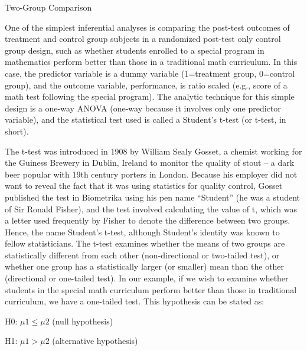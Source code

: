 Two-Group Comparison

One of the simplest inferential analyses is comparing the post-test outcomes of treatment and control group subjects in a randomized post-test only control group design, such as whether students enrolled to a special program in mathematics perform better than those in a traditional math curriculum. In this case, the predictor variable is a dummy variable (1=treatment group, 0=control group), and the outcome variable, performance, is ratio scaled (e.g., score of a math test following the special program). The analytic technique for this simple design is a one-way ANOVA (one-way because it involves only one predictor variable), and the statistical test used is called a Student’s t-test (or t-test, in short). 

The t-test was introduced in 1908 by William Sealy Gosset, a chemist working for the Guiness Brewery in Dublin, Ireland to monitor the quality of stout – a dark beer popular with 19th century porters in London. Because his employer did not want to reveal the fact that it was using statistics for quality control, Gosset published the test in Biometrika using his pen name “Student” (he was a student of Sir Ronald Fisher), and the test involved calculating the value of t, which was a letter used frequently by Fisher to denote the difference between two groups. Hence, the name Student’s t-test, although Student’s identity was known to fellow statisticians. The t-test examines whether the means of two groups are statistically different from each other (non-directional or two-tailed test), or whether one group has a statistically larger (or smaller) mean than the other (directional or one-tailed test). In our example, if we wish to examine whether students in the special math curriculum perform better than those in traditional curriculum, we have a one-tailed test. This hypothesis can be stated as:

H0: $ \mu1 \leq \mu2 $ (null hypothesis)

H1: $ \mu1 > \mu2 $ (alternative hypothesis)

